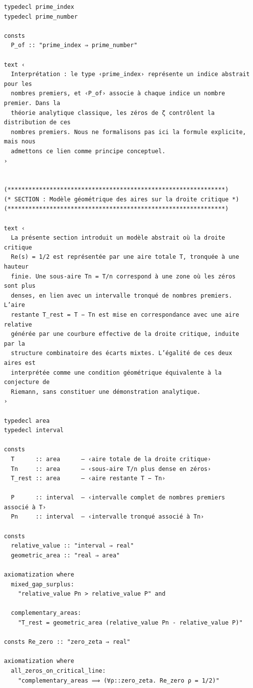 \documentclass[a4paper,11pt]{article}
\begin{document}
\begin{holcode}[title={\textcolor{white}{File: methode\_spectral.thy -- Part 1/4}}]
\begin{lstlisting}
typedecl prime_index
typedecl prime_number

consts
  P_of :: "prime_index ⇒ prime_number"

text ‹
  Interprétation : le type ‹prime_index› représente un indice abstrait pour les
  nombres premiers, et ‹P_of› associe à chaque indice un nombre premier. Dans la
  théorie analytique classique, les zéros de ζ contrôlent la distribution de ces
  nombres premiers. Nous ne formalisons pas ici la formule explicite, mais nous
  admettons ce lien comme principe conceptuel.
›


(**************************************************************)
(* SECTION : Modèle géométrique des aires sur la droite critique *)
(**************************************************************)

text ‹
  La présente section introduit un modèle abstrait où la droite critique
  Re(s) = 1/2 est représentée par une aire totale T, tronquée à une hauteur
  finie. Une sous-aire Tn = T/n correspond à une zone où les zéros sont plus
  denses, en lien avec un intervalle tronqué de nombres premiers. L’aire
  restante T_rest = T − Tn est mise en correspondance avec une aire relative
  générée par une courbure effective de la droite critique, induite par la
  structure combinatoire des écarts mixtes. L’égalité de ces deux aires est
  interprétée comme une condition géométrique équivalente à la conjecture de
  Riemann, sans constituer une démonstration analytique.
›

typedecl area
typedecl interval

consts
  T      :: area      ― ‹aire totale de la droite critique›
  Tn     :: area      ― ‹sous-aire T/n plus dense en zéros›
  T_rest :: area      ― ‹aire restante T − Tn›

  P      :: interval  ― ‹intervalle complet de nombres premiers associé à T›
  Pn     :: interval  ― ‹intervalle tronqué associé à Tn›

consts
  relative_value :: "interval ⇒ real"
  geometric_area :: "real ⇒ area"

axiomatization where
  mixed_gap_surplus:
    "relative_value Pn > relative_value P" and

  complementary_areas:
    "T_rest = geometric_area (relative_value Pn - relative_value P)"

consts Re_zero :: "zero_zeta ⇒ real"

axiomatization where
  all_zeros_on_critical_line:
    "complementary_areas ⟹ (∀ρ::zero_zeta. Re_zero ρ = 1/2)"


\end{lstlisting}
\end{holcode}
\end{document}
